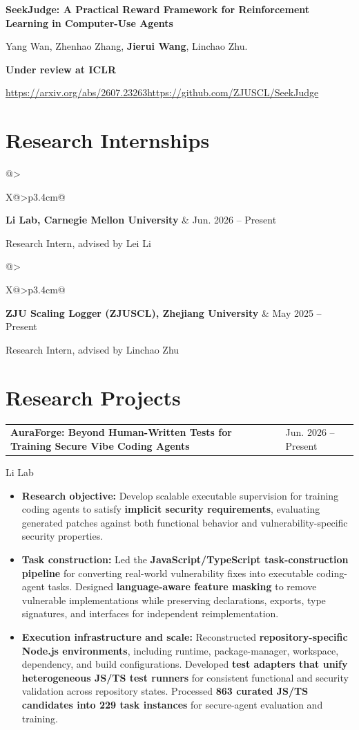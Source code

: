 \documentclass[11pt]{article}
\makeatletter
\newcommand{\cvheading}[2]{%
    \par\noindent
    \begin{tabularx}{\linewidth}{@{}>{\raggedright\arraybackslash}X@{\hspace{0.8em}}>{\raggedleft\arraybackslash}p{3.4cm}@{}}
        \textbf{#1} & {\small\color{CVMuted}#2}
    \end{tabularx}\par\nobreak\vspace{1pt}%
}
\newcommand{\projectheading}[2]{%
    \Needspace{5\baselineskip}%
    \cvheading{#1}{#2}%
}
\newcommand{\affiliation}[1]{%
    {\small\color{CVMuted}#1\par}\nobreak
}
\newcommand{\projectsep}{\par\addvspace{8pt}}
\newcommand{\publication}[3]{%
    \par\Needspace{5\baselineskip}%
    {\bfseries #1\par}\nobreak
    {\small #2\par}\nobreak
    {\small\color{CVMuted}#3\par}%
}
\makeatother
\begin{document}
\projectsep

\publication
    {SeekJudge: A Practical Reward Framework for Reinforcement Learning in Computer-Use Agents}
    {Yang Wan, Zhenhao Zhang, \textbf{Jierui Wang}, Linchao Zhu.}
    {\textbf{Under review at ICLR}\par\nobreak
    \href{https://arxiv.org/abs/2607.23263}{https://arxiv.org/abs/2607.23263}\quad\href{https://github.com/ZJUSCL/SeekJudge}{https://github.com/ZJUSCL/SeekJudge}}

\section{Research Internships}
\cvheading{Li Lab, Carnegie Mellon University}{Jun. 2026 -- Present}
Research Intern, advised by Lei Li

\projectsep

\cvheading{ZJU Scaling Logger (ZJUSCL), Zhejiang University}{May 2025 -- Present}
Research Intern, advised by Linchao Zhu

\section{Research Projects}

\projectheading{AuraForge: Beyond Human-Written Tests for Training Secure Vibe Coding Agents}{Jun. 2026 -- Present}
\affiliation{Li Lab}
\begin{itemize}
    \item \textbf{Research objective:} Develop scalable executable supervision for training coding agents to satisfy \textbf{implicit security requirements}, evaluating generated patches against both functional behavior and vulnerability-specific security properties.
    \item \textbf{Task construction:} Led the \textbf{JavaScript/TypeScript task-construction pipeline} for converting real-world vulnerability fixes into executable coding-agent tasks. Designed \textbf{language-aware feature masking} to remove vulnerable implementations while preserving declarations, exports, type signatures, and interfaces for independent reimplementation.
    \item \textbf{Execution infrastructure and scale:} Reconstructed \textbf{repository-specific Node.js environments}, including runtime, package-manager, workspace, dependency, and build configurations. Developed \textbf{test adapters that unify heterogeneous JS/TS test runners} for consistent functional and security validation across repository states. Processed \textbf{863 curated JS/TS candidates into 229 task instances} for secure-agent evaluation and training.
\end{itemize}
\end{document}
